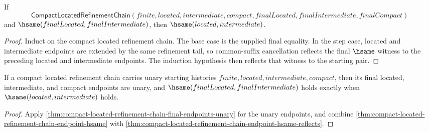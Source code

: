 \begin{theorem}
\label{thm:compact-located-refinement-chain-endpoint-hsame-reflects}
If
$$
\mathsf{CompactLocatedRefinementChain}(finite,located,intermediate,compact,finalLocated,finalIntermediate,finalCompact)
$$
and $\hsame(finalLocated,finalIntermediate)$, then
$\hsame(located,intermediate)$.
\end{theorem}
\begin{proof}
Induct on the compact located refinement chain. The base case is the supplied
final equality. In the step case, located and intermediate endpoints are
extended by the same refinement tail, so common-suffix cancellation reflects
the final $\hsame$ witness to the preceding located and intermediate endpoints.
The induction hypothesis then reflects that witness to the starting pair.
\end{proof}
\begin{theorem}
\label{thm:compact-located-refinement-chain-endpoint-unary-hsame-iff}
If a compact located refinement chain carries unary starting histories
\(finite,located,intermediate,compact\), then its final located,
intermediate, and compact endpoints are unary, and
\(\hsame(finalLocated,finalIntermediate)\) holds exactly when
\(\hsame(located,intermediate)\) holds.
\end{theorem}
\begin{proof}
Apply \autoref{thm:compact-located-refinement-chain-final-endpoints-unary}
for the unary endpoints, and combine
\autoref{thm:compact-located-refinement-chain-endpoint-hsame} with
\autoref{thm:compact-located-refinement-chain-endpoint-hsame-reflects}.
\end{proof}





